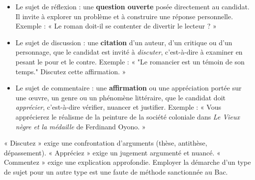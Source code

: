 \documentclass[11pt]{article}
\newcommand{\cle}[1]{{\popxbold\color{popdark}#1}}
\begin{document}
\begin{definition}
\begin{itemize}
\item Le \cle{sujet de réflexion} : une \textbf{question ouverte} posée directement au candidat. Il invite à explorer un problème et à construire une réponse personnelle. Exemple : « Le roman doit-il se contenter de divertir le lecteur ? »
\item Le \cle{sujet de discussion} : une \textbf{citation} d'un auteur, d'un critique ou d'un personnage, que le candidat est invité à \emph{discuter}, c'est-à-dire à examiner en pesant le pour et le contre. Exemple : « "Le romancier est un témoin de son temps." Discutez cette affirmation. »
\item Le \cle{sujet de commentaire} : une \textbf{affirmation} ou une appréciation portée sur une œuvre, un genre ou un phénomène littéraire, que le candidat doit \emph{apprécier}, c'est-à-dire vérifier, nuancer et justifier. Exemple : « Vous apprécierez le réalisme de la peinture de la société coloniale dans \emph{Le Vieux nègre et la médaille} de Ferdinand Oyono. »
\end{itemize}
\end{definition}

\begin{attention}
« Discutez » exige une confrontation d'arguments (thèse, antithèse, dépassement). « Appréciez » exige un jugement argumenté et nuancé. « Commentez » exige une explication approfondie. Employer la démarche d'un type de sujet pour un autre type est une faute de méthode sanctionnée au Bac.
\end{attention}
\end{document}
